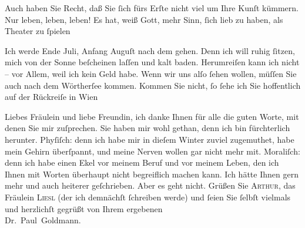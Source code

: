 \pstart
           Auch haben Sie Recht, daß Sie ſich fürs Erſte nicht viel um Ihre Kunſt kümmern. Nur
               leben, leben, leben! Es hat, weiß Gott, mehr Sinn, ſich lieb zu haben, als Theater zu
                  ſpielen{\dotsfive}\pend
           
\pstart
           Ich werde Ende Juli, Anfang Auguſt nach dem \label{K_L03528-2v}\label{K_L03528-2}{ }{\pb}gehen. Denn ich will ruhig ſitzen, mich von der
               Sonne beſcheinen laſſen und kalt baden. Herumreiſen kann ich nicht – vor Allem, weil
               ich kein Geld habe. Wenn wir uns alſo ſehen wollen, müſſen Sie auch nach dem Wörtherſee kommen. Kommen Sie nicht, ſo ſehe ich
               Sie hoffentlich auf der Rückreiſe in Wien\pend
           
\pstart
           Liebes Fräulein und liebe Freundin, ich danke Ihnen für alle die guten Worte, mit
               denen Sie mir zuſprechen. Sie haben mir wohl gethan, denn ich bin fürchterlich
               herunter. {\pb}Phyſiſch: denn ich habe mir in dieſem
               Winter zuviel zugemuthet, habe mein Gehirn überſpannt, und meine Nerven wollen gar
               nicht mehr mit. Moraliſch: denn ich habe einen Ekel vor meinem Beruf und vor meinem
               Leben, den ich Ihnen mit Worten überhaupt nicht begreiflich machen kann. Ich hätte
               Ihnen gern mehr und auch heiterer geſchrieben. Aber es geht nicht. Grüßen Sie \textsc{Arthur}, das Fräulein \textsc{Liesl} (der ich demnächſt ſchreiben werde) und ſeien Sie ſelbſt vielmals und
               herzlichſt gegrüßt von Ihrem ergebenen {\\}\spacefill\mbox{Dr. Paul Goldmann.}\pend
           \endnumbering{}  
      